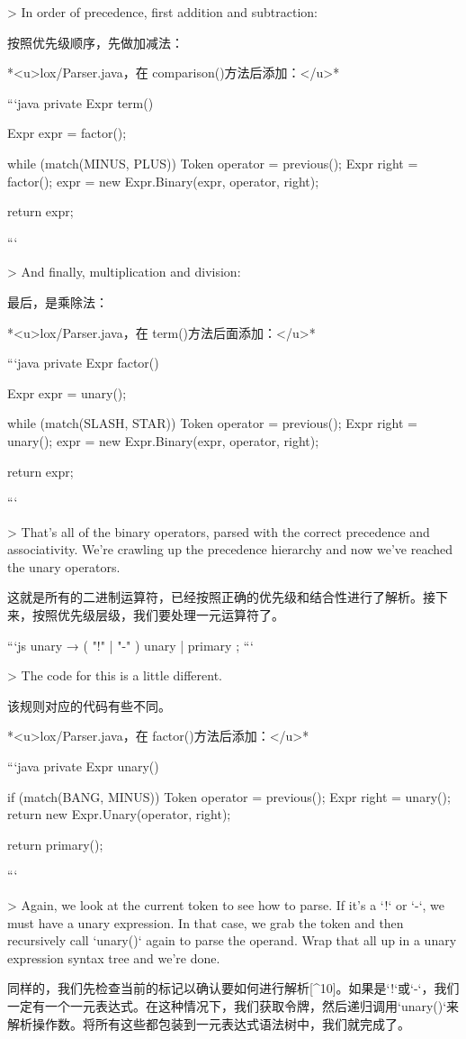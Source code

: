 \documentclass[cn,11pt,chinese]{elegantbook}
\begin{document}
> In order of precedence, first addition and subtraction:

按照优先级顺序，先做加减法：

*<u>lox/Parser.java，在 comparison()方法后添加：</u>*

```java
  private Expr term() {
    Expr expr = factor();

    while (match(MINUS, PLUS)) {
      Token operator = previous();
      Expr right = factor();
      expr = new Expr.Binary(expr, operator, right);
    }

    return expr;
  }
```

> And finally, multiplication and division:

最后，是乘除法：

*<u>lox/Parser.java，在 term()方法后面添加：</u>*

```java
  private Expr factor() {
    Expr expr = unary();

    while (match(SLASH, STAR)) {
      Token operator = previous();
      Expr right = unary();
      expr = new Expr.Binary(expr, operator, right);
    }

    return expr;
  }
```

> That’s all of the binary operators, parsed with the correct precedence and associativity. We’re crawling up the precedence hierarchy and now we’ve reached the unary operators.

这就是所有的二进制运算符，已经按照正确的优先级和结合性进行了解析。接下来，按照优先级层级，我们要处理一元运算符了。

```js
unary          → ( "!" | "-" ) unary
               | primary ;
```

> The code for this is a little different.

该规则对应的代码有些不同。

*<u>lox/Parser.java，在 factor()方法后添加：</u>*

```java
  private Expr unary() {
    if (match(BANG, MINUS)) {
      Token operator = previous();
      Expr right = unary();
      return new Expr.Unary(operator, right);
    }

    return primary();
  }
```

> Again, we look at the current token to see how to parse. If it’s a `!` or `-`, we must have a unary expression. In that case, we grab the token and then recursively call `unary()` again to parse the operand. Wrap that all up in a unary expression syntax tree and we’re done.

同样的，我们先检查当前的标记以确认要如何进行解析[^10]。如果是`!`或`-`，我们一定有一个一元表达式。在这种情况下，我们获取令牌，然后递归调用`unary()`来解析操作数。将所有这些都包装到一元表达式语法树中，我们就完成了。
\end{document}
